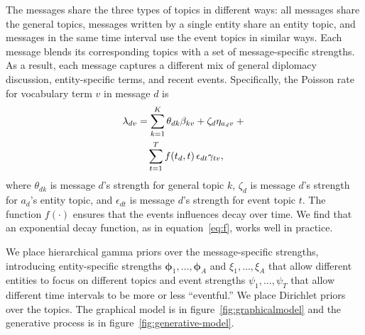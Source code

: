 The messages share the three types of topics in different ways: all
messages share the general topics, messages written by a single entity
share an entity topic, and messages in the same time interval use the
event topics in similar ways. Each message blends its corresponding
topics with a set of message-specific strengths. As a result, each
message captures a different mix of general diplomacy discussion,
entity-specific terms, and recent events. Specifically, the Poisson
rate for vocabulary term $v$ in message $d$ is
\begin{align}
  \lambda_{dv} &= \sum_{k=1}^K \theta_{dk} \beta_{kv}  + \zeta_d
  \eta_{a_dv} + {}\notag \\
  &\quad
  \sum_{t=1}^T f(t_d, t)\, \epsilon_{dt} \gamma_{tv},
\label{eq:poisrate}
\end{align}
where $\theta_{dk}$ is message $d$'s strength for general topic $k$,
$\zeta_{d}$ is message $d$'s strength for $a_d$'s entity topic, and
$\epsilon_{dt}$ is message $d$'s strength for event topic $t$. The
function $f(\cdot)$ ensures that the events influences decay over
time. We find that an exponential decay function, as in
equation~\ref{eq:f}, works well in practice.

We place hierarchical gamma priors over the message-specific
strengths, introducing entity-specific strengths $\mathbold{\phi}_1,
\ldots, \mathbold{\phi}_A$ and $\xi_1, \ldots, \xi_A$ that allow
different entities to focus on different topics and event strengths
$\psi_1, \ldots, \psi_T$ that allow different time intervals to be
more or less ``eventful.'' We place Dirichlet priors over the
topics. The graphical model is in figure~\ref{fig:graphicalmodel} and
the generative process is in figure~\ref{fig:generative-model}.

